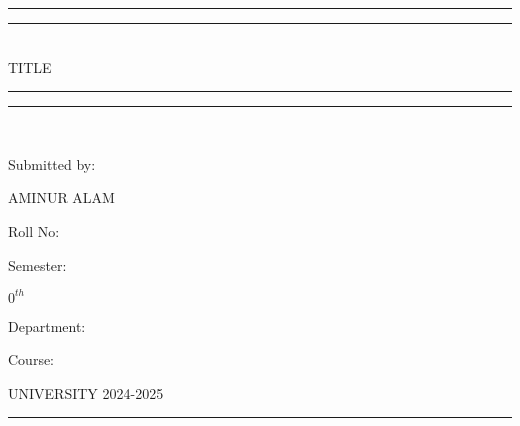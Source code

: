 \documentclass[12pt]{article}
\newcommand{\codequest}[2]{
    {\Large \raggedleft #1}
    \vspace*{2\baselineskip}
    \texttt {}
    \newpage
}
\newcommand{\quest}[2]{
    {\Large \raggedleft #1}
    \vspace*{2\baselineskip}
    #2
    \vfill
    \rule{\textwidth}{0.4pt}
    \newpage
}
\begin{document}
\begin{titlepage}
    \centering
    \vspace*{4\baselineskip}
    \rule{\textwidth}{1.6pt}\vspace*{-\baselineskip}\vspace*{2pt}
    \rule{\textwidth}{0.4pt}\\[\baselineskip]
    {\huge
        TITLE \\[0.3\baselineskip]
    }
    \rule{\textwidth}{0.4pt}\vspace*{-\baselineskip}\vspace{3.2pt}
    \rule{\textwidth}{1.6pt}\\[\baselineskip]
    \scshape
    \vfill
    \raggedright
    Submitted by: {\Large AMINUR ALAM\par}
    Roll No: {\Large {}\par}
    Semester: {\Large $0^{th}$\par}
    Department: {\Large {}\par}
    Course: {\Large {}\par}
    \vfill
    \raggedleft
    {} UNIVERSITY 2024-2025
\end{titlepage}
\restoregeometry

\codequest{}{}

\quest{}{}
\end{document}
